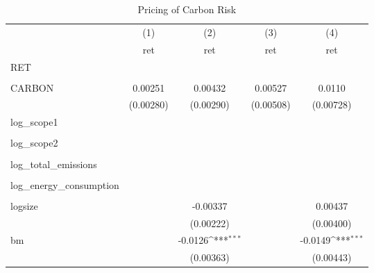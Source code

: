 \begin{table}[htbp]\centering
\def\sym#1{\ifmmode^{#1}\else\(^{#1}\)\fi}
\caption{Pricing of Carbon Risk}
\begin{tabular}{l*{4}{c}}
\hline\hline
                &\multicolumn{1}{c}{(1)}&\multicolumn{1}{c}{(2)}&\multicolumn{1}{c}{(3)}&\multicolumn{1}{c}{(4)}\\
                &\multicolumn{1}{c}{ret}&\multicolumn{1}{c}{ret}&\multicolumn{1}{c}{ret}&\multicolumn{1}{c}{ret}\\
\hline
RET             &                  &                  &                  &                  \\
                &                  &                  &                  &                  \\
CARBON          &  0.00251         &  0.00432         &  0.00527         &   0.0110         \\
                &(0.00280)         &(0.00290)         &(0.00508)         &(0.00728)         \\
log\_scope1      &                  &                  &                  &                  \\
                &                  &                  &                  &                  \\
log\_scope2      &                  &                  &                  &                  \\
                &                  &                  &                  &                  \\
log\_total\_emissions&                  &                  &                  &                  \\
                &                  &                  &                  &                  \\
log\_energy\_consumption&                  &                  &                  &                  \\
                &                  &                  &                  &                  \\
logsize         &                  & -0.00337         &                  &  0.00437         \\
                &                  &(0.00222)         &                  &(0.00400)         \\
bm              &                  &  -0.0126\sym{***}&                  &  -0.0149\sym{***}\\
                &                  &(0.00363)         &                  &(0.00443)         \\

\end{tabular}
\end{table}
